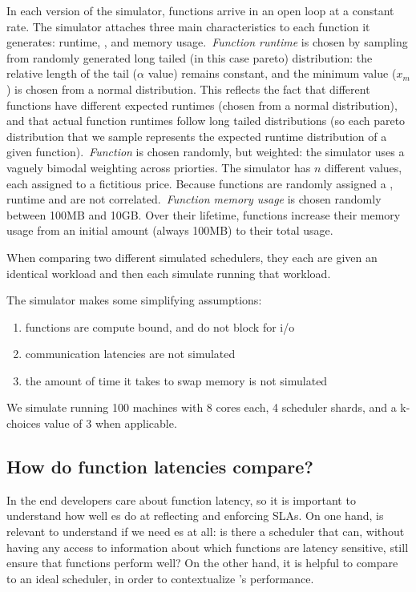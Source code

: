 In each version of the simulator, functions arrive in an open loop at a constant
rate. The simulator attaches three main characteristics to each function it
generates: runtime, \priceclass{}, and memory usage.\ \textit{Function runtime}
is chosen by sampling from randomly generated long tailed (in this case pareto)
distribution: the relative length of the tail ($\alpha$ value) remains constant,
and the minimum value ($x_m$) is chosen from a normal distribution. This
reflects the fact that different functions have different expected runtimes
(chosen from a normal distribution), and that actual function runtimes follow
long tailed distributions (so each pareto distribution that we sample represents
the expected runtime distribution of a given function).\ \textit{Function
\class{}} is chosen randomly, but weighted: the simulator uses a vaguely bimodal
weighting across priorties. The simulator has $n$ different \priceclass{} values,
each assigned to a fictitious price. Because functions are randomly assigned a
\class{}, runtime and \class{} are not correlated.\ \textit{Function memory
usage} is chosen randomly between 100MB and 10GB. Over their lifetime, functions
increase their memory usage from an initial amount (always 100MB) to their total
usage.

When comparing two different simulated schedulers, they each are given an
identical workload and then each simulate running that workload.

The simulator makes some simplifying assumptions:
\begin{enumerate}
    \item functions are compute bound, and do not block for i/o
    \item communication latencies are not simulated
    \item the amount of time it takes to swap memory is not simulated
\end{enumerate}

We simulate running 100 machines with 8 cores each, 4 scheduler shards, and a
k-choices value of 3 when applicable.

\subsection{How do function latencies compare?}

In the end developers care about function latency, so it is important to
understand how well \priceclass{}es do at reflecting and enforcing SLAs. On one
hand, is relevant to understand if we need \class{}es at all: is there a
scheduler that can, without having any access to information about which
functions are latency sensitive, still ensure that functions perform well? On
the other hand, it is helpful to compare \sys{} to an ideal scheduler, in order
to contextualize \sys{}'s performance.

